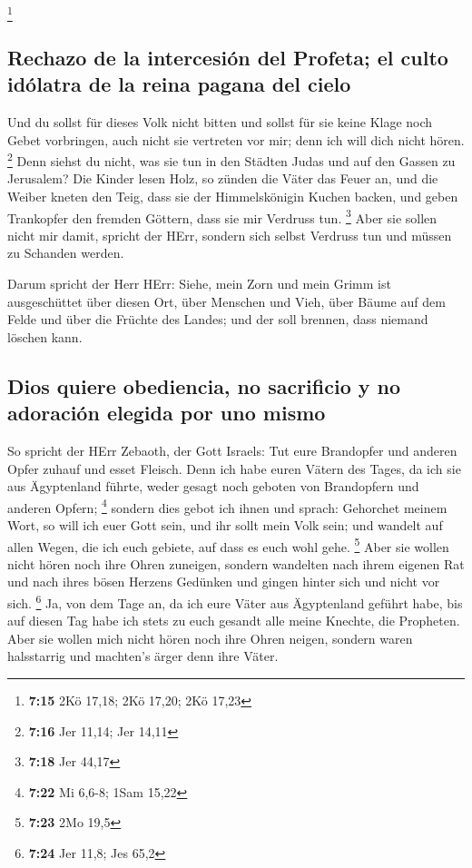 \footnote{\textbf{7:15} 2Kö 17,18; 2Kö 17,20; 2Kö 17,23}

\hypertarget{rechazo-de-la-intercesiuxf3n-del-profeta-el-culto-iduxf3latra-de-la-reina-pagana-del-cielo}{%
\subsection{Rechazo de la intercesión del Profeta; el culto idólatra de
la reina pagana del
cielo}\label{rechazo-de-la-intercesiuxf3n-del-profeta-el-culto-iduxf3latra-de-la-reina-pagana-del-cielo}}

 Und du sollst für dieses Volk nicht bitten und sollst
für sie keine Klage noch Gebet vorbringen, auch nicht sie vertreten vor
mir; denn ich will dich nicht hören. \footnote{\textbf{7:16} Jer 11,14;
  Jer 14,11}  Denn siehst du nicht, was sie tun in den
Städten Judas und auf den Gassen zu Jerusalem?  Die
Kinder lesen Holz, so zünden die Väter das Feuer an, und die Weiber
kneten den Teig, dass sie der Himmelskönigin Kuchen backen, und geben
Trankopfer den fremden Göttern, dass sie mir Verdruss tun. \footnote{\textbf{7:18}
  Jer 44,17}  Aber sie sollen nicht mir damit, spricht
der HErr, sondern sich selbst Verdruss tun und müssen zu Schanden
werden.

 Darum spricht der Herr HErr: Siehe, mein Zorn und mein
Grimm ist ausgeschüttet über diesen Ort, über Menschen und Vieh, über
Bäume auf dem Felde und über die Früchte des Landes; und der soll
brennen, dass niemand löschen kann.

\hypertarget{dios-quiere-obediencia-no-sacrificio-y-no-adoraciuxf3n-elegida-por-uno-mismo}{%
\subsection{Dios quiere obediencia, no sacrificio y no adoración elegida
por uno
mismo}\label{dios-quiere-obediencia-no-sacrificio-y-no-adoraciuxf3n-elegida-por-uno-mismo}}

 So spricht der HErr Zebaoth, der Gott Israels: Tut eure
Brandopfer und anderen Opfer zuhauf und esset Fleisch. 
Denn ich habe euren Vätern des Tages, da ich sie aus Ägyptenland führte,
weder gesagt noch geboten von Brandopfern und anderen Opfern;
\footnote{\textbf{7:22} Mi 6,6-8; 1Sam 15,22}  sondern
dies gebot ich ihnen und sprach: Gehorchet meinem Wort, so will ich euer
Gott sein, und ihr sollt mein Volk sein; und wandelt auf allen Wegen,
die ich euch gebiete, auf dass es euch wohl gehe. \footnote{\textbf{7:23}
  2Mo 19,5}  Aber sie wollen nicht hören noch ihre Ohren
zuneigen, sondern wandelten nach ihrem eigenen Rat und nach ihres bösen
Herzens Gedünken und gingen hinter sich und nicht vor sich. \footnote{\textbf{7:24}
  Jer 11,8; Jes 65,2}  Ja, von dem Tage an, da ich eure
Väter aus Ägyptenland geführt habe, bis auf diesen Tag habe ich stets zu
euch gesandt alle meine Knechte, die Propheten.  Aber sie
wollen mich nicht hören noch ihre Ohren neigen, sondern waren
halsstarrig und machten's ärger denn ihre Väter.

